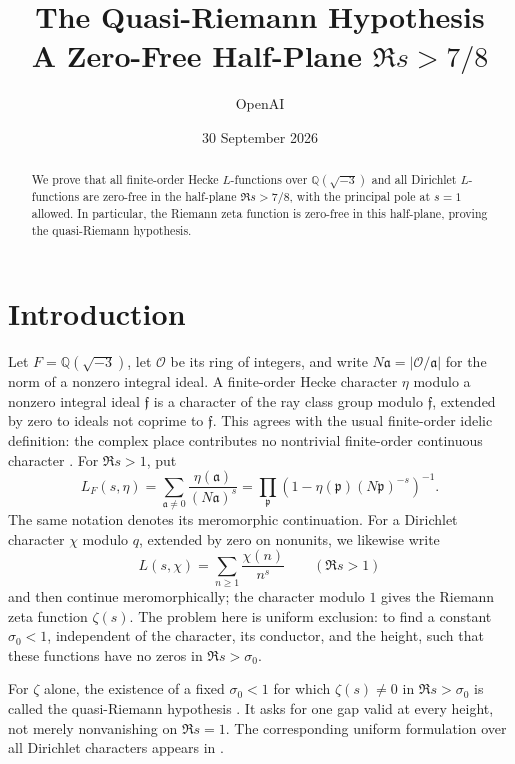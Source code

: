 \documentclass[11pt,a4paper]{article}
\title{The Quasi-Riemann Hypothesis\\[0.5em]
\large A Zero-Free Half-Plane \texorpdfstring{$\Re s>7/8$}{Re(s)>7/8}}
\author{OpenAI}
\date{30 September 2026}
\numberwithin{equation}{section}
\numberwithin{figure}{section}
\theoremstyle{definition}
\theoremstyle{remark}
\begin{document}
\maketitle

\begin{abstract}
We prove that all finite-order Hecke $L$-functions over
$\mathbb Q(\sqrt{-3})$ and all Dirichlet $L$-functions are zero-free in
the half-plane $\Re s>7/8$, with the principal pole at $s=1$ allowed.
In particular, the Riemann zeta function is zero-free in this half-plane,
proving the quasi-Riemann hypothesis.
\end{abstract}

\tableofcontents
\clearpage

\section{Introduction}\label{sec:introduction}

Let $F=\mathbb Q(\sqrt{-3})$, let $\mathcal O$ be its ring of integers,
and write $N\mathfrak a=|\mathcal O/\mathfrak a|$ for the norm of a
nonzero integral ideal. A finite-order Hecke character $\eta$ modulo
a nonzero integral ideal $\mathfrak f$ is a character of the ray class group
modulo $\mathfrak f$, extended by zero to ideals not coprime to $\mathfrak f$.
This agrees with the usual finite-order idelic definition: the complex
place contributes no nontrivial finite-order continuous character
\cite[Chapter VI, Section 1]{MilneCFT}. For $\Re s>1$, put
\[
 L_F(s,\eta)=\sum_{\mathfrak a\ne0}
       \frac{\eta(\mathfrak a)}{(N\mathfrak a)^s}
 =\prod_{\mathfrak p}
       \left(1-\eta(\mathfrak p)(N\mathfrak p)^{-s}\right)^{-1}.
\]
The same notation denotes its meromorphic continuation. For a
Dirichlet character $\chi$ modulo $q$, extended by zero on nonunits, we
likewise write
\[
 L(s,\chi)=\sum_{n\ge1}\frac{\chi(n)}{n^s}
 \qquad(\Re s>1)
\]
and then continue meromorphically; the character modulo $1$ gives the
Riemann zeta function $\zeta(s)$. The problem here is uniform exclusion:
to find a constant $\sigma_0<1$, independent of the character, its
conductor, and the height, such that these functions have no zeros in
$\Re s>\sigma_0$.

For $\zeta$ alone, the existence of a fixed $\sigma_0<1$ for which
$\zeta(s)\ne0$ in $\Re s>\sigma_0$ is called the quasi-Riemann
hypothesis \cite[Section 1]{BCSS}. It asks for one gap valid at every
height, not merely nonvanishing on $\Re s=1$. The corresponding uniform
formulation over all Dirichlet characters appears in
\cite[p.~288, Equation (1.4) and the following paragraph]{FG}.
\end{document}
